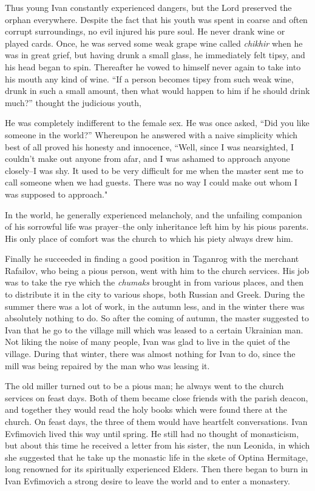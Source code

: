 Thus young Ivan constantly experienced dangers, but the Lord preserved the orphan everywhere. Despite the fact that his youth was spent in coarse and often corrupt surroundings, no evil injured his pure soul. He never drank wine or played cards. Once, he was served some weak grape wine called \textit{chikhir} when he was in great grief, but having drunk a small glass, he immediately felt tipsy, and his head began to spin. Thereafter he vowed to himself never again to take into his mouth any kind of wine. “If a person becomes tipsy from such weak wine, drunk in such a small amount, then what would happen to him if he should drink much?” thought the judicious youth,

He was completely indifferent to the female sex. He was once asked, “Did you like someone in the world?” Whereupon he answered with a naive simplicity which best of all proved his honesty and innocence, “Well, since I was nearsighted, I couldn't make out anyone from afar, and I was ashamed to approach anyone closely--I was shy. It used to be very difficult for me when the master sent me to call someone when we had guests. There was no way I could make out whom I was supposed to approach."

In the world, he generally experienced melancholy, and the unfailing companion of his sorrowful life was prayer--the only inheritance left him by his pious parents. His only place of comfort was the church to which his piety always drew him.

Finally he succeeded in finding a good position in Taganrog with the merchant Rafailov, who being a pious person, went with him to the church services. His job was to take the rye which the \textit{chumaks} brought in from various places, and then to distribute it in the city to various shops, both Russian and Greek. During the summer there was a lot of work, in the autumn less, and in the winter there was absolutely nothing to do. So after the coming of autumn, the master suggested to Ivan that he go to the village mill which was leased to a certain Ukrainian man. Not liking the noise of many people, Ivan was glad to live in the quiet of the village. During that winter, there was almost nothing for Ivan to do, since the mill was being repaired by the man who was leasing it.

The old miller turned out to be a pious man; he always went to the church services on feast days. Both of them became close friends with the parish deacon, and together they would read the holy books which were found there at the church. On feast days, the three of them would have heartfelt conversations. Ivan Evfimovich lived this way until spring. He still had no thought of monasticism, but about this time he received a letter from his sister, the nun Leonida, in which she suggested that he take up the monastic life in the skete of Optina Hermitage, long renowned for its spiritually experienced Elders. Then there began to burn in Ivan Evfimovich a strong desire to leave the world and to enter a monastery.


